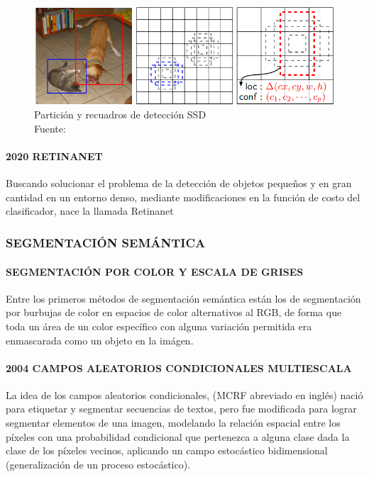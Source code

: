 \begin{figure}[H]
    \centering
    \includegraphics[scale=0.4]{imagenes/ssd}
    \caption[Partición y recuadros de detección SSD]{Partición y recuadros de detección SSD\\Fuente: \citep{liu-ssd}}
\end{figure}
\paragraph{2020 RETINANET}
Buscando solucionar el problema de la detección de objetos pequeños y en gran cantidad en un entorno denso, mediante modificaciones en la función de costo del clasificador, nace la llamada Retinanet \citep{retinanet}

\subsubsection{SEGMENTACIÓN SEMÁNTICA}

\paragraph{SEGMENTACIÓN POR COLOR Y ESCALA DE GRISES}
Entre los primeros métodos de segmentación semántica están los de segmentación por burbujas de color en espacios de color alternativos al RGB, de forma que toda un área de un color específico con alguna variación permitida era enmascarada como un objeto en la imágen.

\paragraph{2004 CAMPOS ALEATORIOS CONDICIONALES MULTIESCALA}
La idea de los campos aleatorios condicionales, (MCRF abreviado en inglés) nació para etiquetar y segmentar secuencias de textos, pero fue modificada para lograr segmentar elementos de una imagen, modelando la relación espacial entre los píxeles con una probabilidad condicional que pertenezca a alguna clase dada la clase de los píxeles vecinos, aplicando un campo estocástico bidimensional (generalización de un proceso estocástico). \citep{segmentation-crf}

